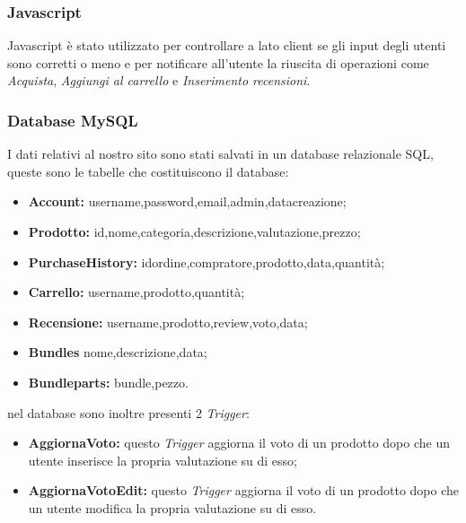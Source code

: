 \subsubsection{Javascript}
Javascript è stato utilizzato per controllare a lato client se gli input degli utenti sono corretti o meno e per notificare all'utente la riuscita di operazioni come 
\emph{Acquista}, \emph{Aggiungi al carrello} e \emph{Inserimento recensioni}.

\subsubsection{Database MySQL}
I dati relativi al nostro sito sono stati salvati in un database relazionale SQL, queste sono le tabelle che costituiscono il database:
\begin{itemize}
    \item \textbf{Account:} username,password,email,admin,datacreazione;
    \item \textbf{Prodotto:} id,nome,categoria,descrizione,valutazione,prezzo;
    \item \textbf{PurchaseHistory:} idordine,compratore,prodotto,data,quantità;
    \item \textbf{Carrello:} username,prodotto,quantità;
    \item \textbf{Recensione:} username,prodotto,review,voto,data;
    \item \textbf{Bundles} nome,descrizione,data;
    \item \textbf{Bundleparts:} bundle,pezzo.	
\end{itemize}
nel database sono inoltre presenti 2 \emph{Trigger}:
\begin{itemize}
	\item \textbf{AggiornaVoto:} questo \emph{Trigger} aggiorna il voto di un prodotto dopo che un utente inserisce la propria valutazione su di esso;
	\item \textbf{AggiornaVotoEdit:} questo \emph{Trigger} aggiorna il voto di un prodotto dopo che un utente modifica la propria valutazione su di esso.
\end{itemize}

